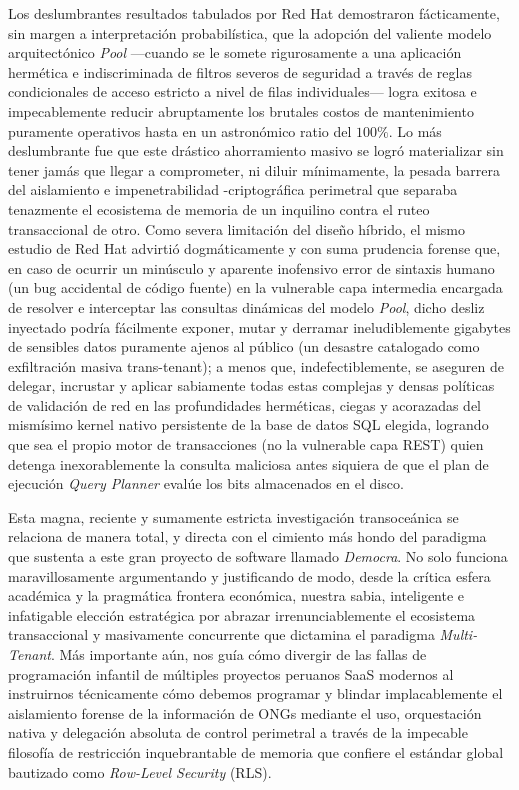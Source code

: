Los deslumbrantes resultados tabulados por Red Hat demostraron fácticamente, sin margen a interpretación probabilística, que la adopción del valiente modelo arquitectónico \textit{Pool} ---cuando se le somete rigurosamente a una aplicación hermética e indiscriminada de filtros severos de seguridad a través de reglas condicionales de acceso estricto a nivel de filas individuales--- logra exitosa e impecablemente reducir abruptamente los brutales costos de mantenimiento puramente operativos hasta en un astronómico ratio del $100\%$. Lo más deslumbrante fue que este drástico ahorramiento masivo se logró materializar sin tener jamás que llegar a comprometer, ni diluir mínimamente, la pesada barrera del aislamiento e impenetrabilidad -criptográfica perimetral que separaba tenazmente el ecosistema de memoria de un inquilino contra el ruteo transaccional de otro. Como severa limitación del diseño híbrido, el mismo estudio de Red Hat advirtió dogmáticamente y con suma prudencia forense que, en caso de ocurrir un minúsculo y aparente inofensivo error de sintaxis humano (un bug accidental de código fuente) en la vulnerable capa intermedia encargada de resolver e interceptar las consultas dinámicas del modelo \textit{Pool}, dicho desliz inyectado podría fácilmente exponer, mutar y derramar ineludiblemente gigabytes de sensibles datos puramente ajenos al público (un desastre catalogado como exfiltración masiva trans-tenant); a menos que, indefectiblemente, se aseguren de delegar, incrustar y aplicar sabiamente todas estas complejas y densas políticas de validación de red en las profundidades herméticas, ciegas y acorazadas del mismísimo kernel nativo persistente de la base de datos SQL elegida, logrando que sea el propio motor de transacciones (no la vulnerable capa REST) quien detenga inexorablemente la consulta maliciosa antes siquiera de que el plan de ejecución \textit{Query Planner} evalúe los bits almacenados en el disco.

Esta magna, reciente y sumamente estricta investigación transoceánica se relaciona de manera total, y directa con el cimiento más hondo del paradigma que sustenta a este gran proyecto de software llamado \textit{Democra}. No solo funciona maravillosamente argumentando y justificando de modo, desde la crítica esfera académica y la pragmática frontera económica, nuestra sabia, inteligente e infatigable elección estratégica por abrazar irrenunciablemente el ecosistema transaccional y masivamente concurrente que dictamina el paradigma \textit{Multi-Tenant}. Más importante aún, nos guía cómo divergir de las fallas de programación infantil de múltiples proyectos peruanos SaaS modernos al instruirnos técnicamente cómo debemos programar y blindar implacablemente el aislamiento forense de la información de ONGs mediante el uso, orquestación nativa y delegación absoluta de control perimetral a través de la impecable filosofía de restricción inquebrantable de memoria que confiere el estándar global bautizado como \textit{Row-Level Security} (RLS).

